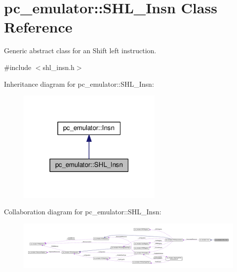 \hypertarget{classpc__emulator_1_1SHL__Insn}{}\section{pc\+\_\+emulator\+:\+:S\+H\+L\+\_\+\+Insn Class Reference}
\label{classpc__emulator_1_1SHL__Insn}


Generic abstract class for an Shift left instruction.  




{\ttfamily \#include $<$shl\+\_\+insn.\+h$>$}



Inheritance diagram for pc\+\_\+emulator\+:\+:S\+H\+L\+\_\+\+Insn\+:
\nopagebreak
\begin{figure}[H]
\begin{center}
\leavevmode
\includegraphics[width=199pt]{classpc__emulator_1_1SHL__Insn__inherit__graph}
\end{center}
\end{figure}


Collaboration diagram for pc\+\_\+emulator\+:\+:S\+H\+L\+\_\+\+Insn\+:
\nopagebreak
\begin{figure}[H]
\begin{center}
\leavevmode
\includegraphics[width=350pt]{classpc__emulator_1_1SHL__Insn__coll__graph}
\end{center}
\end{figure}
